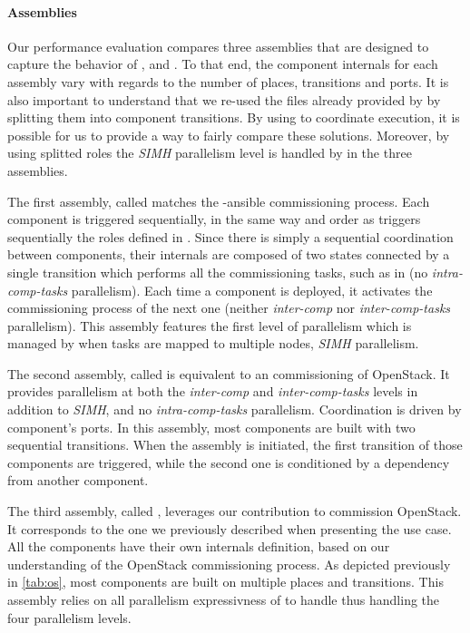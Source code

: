 \paragraph{Assemblies}
Our performance evaluation compares three assemblies that
are designed to capture the behavior of \ansible, \aeolus and \mad. To
that end, the component internals for each assembly vary with regards
to the number of places, transitions and ports. It is also important
to understand that we re-used the \ansible files already provided by
\kolla by splitting them into component transitions. By using \mad to
coordinate \ansible execution, it is possible for us to provide a way
to fairly compare these solutions. Moreover, by using splitted \kolla
roles the \emph{SIMH} parallelism level is handled by \ansible in the
three assemblies.

The first assembly, called \ansass matches the \kolla-ansible
commissioning process. Each component is triggered sequentially, in
the same way and order as \ansible triggers sequentially the roles
defined in \kolla. Since there is simply a sequential coordination
between components, their internals are composed of two states
connected by a single transition which performs all the commissioning
tasks, such as in \kolla (\ie no \emph{intra-comp-tasks}
parallelism). Each time a component is deployed, it activates the
commissioning process of the next one (\ie neither \emph{inter-comp}
nor \emph{inter-comp-tasks} parallelism). This assembly features the
first level of parallelism which is managed by \ansible when tasks are
mapped to multiple nodes, \ie \emph{SIMH} parallelism.
%

The second assembly, called \aeoass is equivalent to an \aeolus
commissioning of OpenStack. It provides parallelism at both the
\emph{inter-comp} and \emph{inter-comp-tasks} levels in addition to
\emph{SIMH}, and no \emph{intra-comp-tasks} parallelism. Coordination
is driven by component's ports. In this assembly, most components are
built with two sequential transitions. When the assembly is
initiated, the first transition of those components are triggered,
while the second one is conditioned by a dependency from another
component.
%

The third assembly, called \madass, leverages our contribution to
commission OpenStack. It corresponds to the one we previously
described when presenting the use case. All the components have their
own internals definition, based on our understanding of the OpenStack
commissioning process. As depicted previously in \cref{tab:os}, most
components are built on multiple places and transitions. This assembly
relies on all parallelism expressivness of \mad to handle thus handling the four 
parallelism levels.

